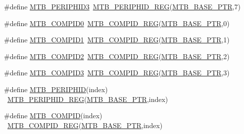 \begin{DoxyCompactItemize}
\item 
\#define \hyperlink{group___m_t_b___register___accessor___macros_ga7e91dad38910eedaf71d7289c6b51b2f}{M\+T\+B\+\_\+\+P\+E\+R\+I\+P\+H\+I\+D3}~\hyperlink{group___m_t_b___register___accessor___macros_gafcffdf38c49f6e8fafa6d701a8cc3109}{M\+T\+B\+\_\+\+P\+E\+R\+I\+P\+H\+I\+D\+\_\+\+R\+EG}(\hyperlink{group___m_t_b___peripheral_gadf7f362dfa67354951e6a23ddf08cd73}{M\+T\+B\+\_\+\+B\+A\+S\+E\+\_\+\+P\+TR},7)
\item 
\#define \hyperlink{group___m_t_b___register___accessor___macros_ga901855e16dc139d51b1bf714d6d95f16}{M\+T\+B\+\_\+\+C\+O\+M\+P\+I\+D0}~\hyperlink{group___m_t_b___register___accessor___macros_ga52410b03c889a62143894894543baf6e}{M\+T\+B\+\_\+\+C\+O\+M\+P\+I\+D\+\_\+\+R\+EG}(\hyperlink{group___m_t_b___peripheral_gadf7f362dfa67354951e6a23ddf08cd73}{M\+T\+B\+\_\+\+B\+A\+S\+E\+\_\+\+P\+TR},0)
\item 
\#define \hyperlink{group___m_t_b___register___accessor___macros_ga15d3e8373163542151e15ba67f8796a4}{M\+T\+B\+\_\+\+C\+O\+M\+P\+I\+D1}~\hyperlink{group___m_t_b___register___accessor___macros_ga52410b03c889a62143894894543baf6e}{M\+T\+B\+\_\+\+C\+O\+M\+P\+I\+D\+\_\+\+R\+EG}(\hyperlink{group___m_t_b___peripheral_gadf7f362dfa67354951e6a23ddf08cd73}{M\+T\+B\+\_\+\+B\+A\+S\+E\+\_\+\+P\+TR},1)
\item 
\#define \hyperlink{group___m_t_b___register___accessor___macros_gae583594b06b5ef3ec80b99fa81d38738}{M\+T\+B\+\_\+\+C\+O\+M\+P\+I\+D2}~\hyperlink{group___m_t_b___register___accessor___macros_ga52410b03c889a62143894894543baf6e}{M\+T\+B\+\_\+\+C\+O\+M\+P\+I\+D\+\_\+\+R\+EG}(\hyperlink{group___m_t_b___peripheral_gadf7f362dfa67354951e6a23ddf08cd73}{M\+T\+B\+\_\+\+B\+A\+S\+E\+\_\+\+P\+TR},2)
\item 
\#define \hyperlink{group___m_t_b___register___accessor___macros_ga9bcae33e61ced6f8a480cb42bb9405af}{M\+T\+B\+\_\+\+C\+O\+M\+P\+I\+D3}~\hyperlink{group___m_t_b___register___accessor___macros_ga52410b03c889a62143894894543baf6e}{M\+T\+B\+\_\+\+C\+O\+M\+P\+I\+D\+\_\+\+R\+EG}(\hyperlink{group___m_t_b___peripheral_gadf7f362dfa67354951e6a23ddf08cd73}{M\+T\+B\+\_\+\+B\+A\+S\+E\+\_\+\+P\+TR},3)
\item 
\#define \hyperlink{group___m_t_b___register___accessor___macros_gab801f8d7fef0f9d6e079283a4f975a4c}{M\+T\+B\+\_\+\+P\+E\+R\+I\+P\+H\+ID}(index)                                        ~\hyperlink{group___m_t_b___register___accessor___macros_gafcffdf38c49f6e8fafa6d701a8cc3109}{M\+T\+B\+\_\+\+P\+E\+R\+I\+P\+H\+I\+D\+\_\+\+R\+EG}(\hyperlink{group___m_t_b___peripheral_gadf7f362dfa67354951e6a23ddf08cd73}{M\+T\+B\+\_\+\+B\+A\+S\+E\+\_\+\+P\+TR},index)
\item 
\#define \hyperlink{group___m_t_b___register___accessor___macros_ga59398557811cd1b8dde435e703ce12b9}{M\+T\+B\+\_\+\+C\+O\+M\+P\+ID}(index)                                            ~\hyperlink{group___m_t_b___register___accessor___macros_ga52410b03c889a62143894894543baf6e}{M\+T\+B\+\_\+\+C\+O\+M\+P\+I\+D\+\_\+\+R\+EG}(\hyperlink{group___m_t_b___peripheral_gadf7f362dfa67354951e6a23ddf08cd73}{M\+T\+B\+\_\+\+B\+A\+S\+E\+\_\+\+P\+TR},index)
\end{DoxyCompactItemize}


